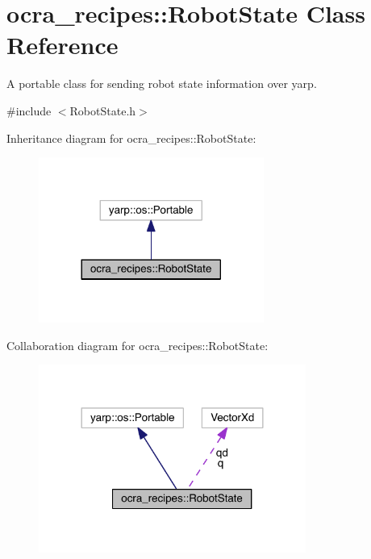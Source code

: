 \hypertarget{classocra__recipes_1_1RobotState}{}\section{ocra\+\_\+recipes\+:\+:Robot\+State Class Reference}
\label{classocra__recipes_1_1RobotState}


A portable class for sending robot state information over yarp.  




{\ttfamily \#include $<$Robot\+State.\+h$>$}



Inheritance diagram for ocra\+\_\+recipes\+:\+:Robot\+State\+:\nopagebreak
\begin{figure}[H]
\begin{center}
\leavevmode
\includegraphics[width=209pt]{da/d8b/classocra__recipes_1_1RobotState__inherit__graph}
\end{center}
\end{figure}


Collaboration diagram for ocra\+\_\+recipes\+:\+:Robot\+State\+:\nopagebreak
\begin{figure}[H]
\begin{center}
\leavevmode
\includegraphics[width=248pt]{d1/dc6/classocra__recipes_1_1RobotState__coll__graph}
\end{center}
\end{figure}
